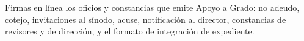 \documentclass[11pt,a4paper]{article}
\begin{document}
{\small\tableofcontents}
\newpage
\begin{quevasahacer}
Firmas en línea los oficios y constancias que emite Apoyo a Grado: no adeudo, cotejo, invitaciones al sínodo, acuse, notificación al director, constancias de revisores y de dirección, y el formato de integración de expediente.
\end{quevasahacer}



\end{document}
